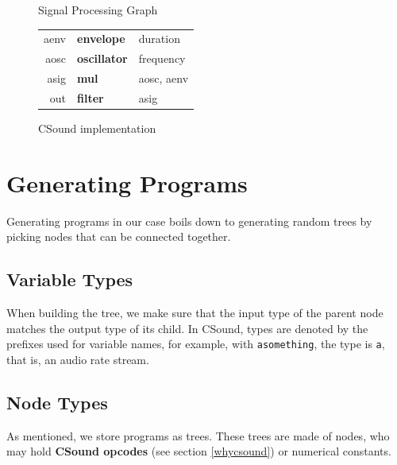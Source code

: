 \documentclass{article}
\newcommand{\code}[1]{\texttt{#1}}
\begin{document}
\begin{figure}[H]
    \centering
    \begin{minipage}[b]{.5\textwidth}
        \centering
        \caption{Signal Processing Graph}
        \label{figtree}
    \end{minipage}%
    \begin{minipage}[b]{.5\textwidth}
        \centering
        \begin{tabular}{ r l l }
    aenv & \textbf{envelope} & duration \\
    aosc & \textbf{oscillator} & frequency \\
    asig & \textbf{mul} & aosc, aenv \\
    out & \textbf{filter} & asig \\
    \end{tabular}
    \caption{CSound implementation}
    \end{minipage}
\end{figure}


\section{Generating Programs}

Generating programs in our case boils down to generating random trees by picking nodes that can be connected together.

\subsection{Variable Types}

When building the tree, we make sure that the input type of the parent node matches the output type of its child. In CSound, types are denoted by the prefixes used for variable names, for example, with \code{asomething}, the type is \code{a}, that is, an audio rate stream.

\subsection{Node Types}

As mentioned, we store programs as trees. These trees are made of nodes, who may hold \textbf{CSound opcodes} (see section \ref{whycsound}) or numerical constants.
\end{document}
